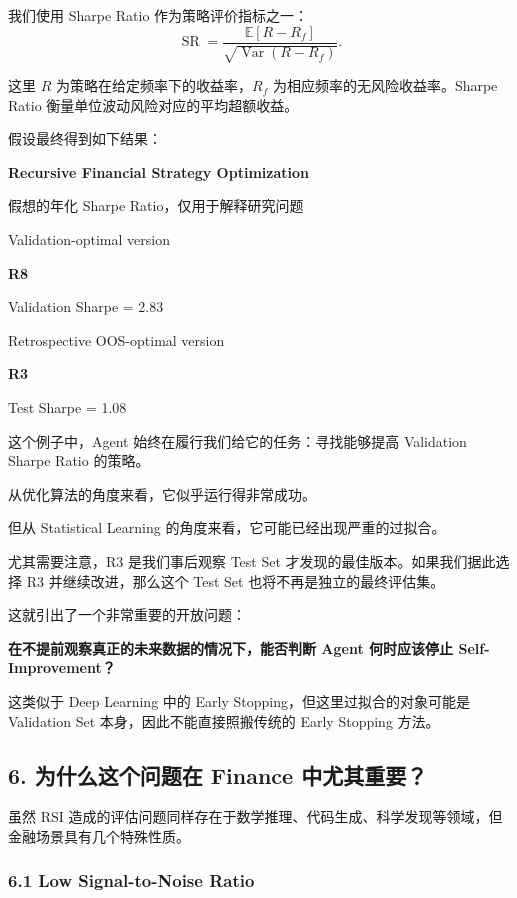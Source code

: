 我们使用 Sharpe Ratio 作为策略评价指标之一：
\[\operatorname{SR}
=
\frac{\mathbb E[R-R_f]}
{\sqrt{\operatorname{Var}(R-R_f)}}.\]

这里 \(R\) 为策略在给定频率下的收益率，\(R_f\) 为相应频率的无风险收益率。Sharpe Ratio 衡量单位波动风险对应的平均超额收益。

假设最终得到如下结果：

\textbf{Recursive Financial Strategy Optimization}

假想的年化 Sharpe Ratio，仅用于解释研究问题


Validation-optimal version

\textbf{R8}

Validation Sharpe = 2.83

Retrospective OOS-optimal version

\textbf{R3}

Test Sharpe = 1.08

这个例子中，Agent 始终在履行我们给它的任务：寻找能够提高 Validation Sharpe Ratio 的策略。

从优化算法的角度来看，它似乎运行得非常成功。

但从 Statistical Learning 的角度来看，它可能已经出现严重的过拟合。

尤其需要注意，R3 是我们事后观察 Test Set 才发现的最佳版本。如果我们据此选择 R3 并继续改进，那么这个 Test Set 也将不再是独立的最终评估集。

这就引出了一个非常重要的开放问题：

\textbf{在不提前观察真正的未来数据的情况下，能否判断 Agent 何时应该停止 Self-Improvement？}

这类似于 Deep Learning 中的 Early Stopping，但这里过拟合的对象可能是 Validation Set 本身，因此不能直接照搬传统的 Early Stopping 方法。

\hypertarget{part-1-03-0001-ux4e3aux4ec0ux4e48ux8fd9ux4e2aux95eeux9898ux5728-finance-ux4e2dux5c24ux5176ux91cdux8981}{%
\subsection{6. 为什么这个问题在 Finance 中尤其重要？}\label{part-1-03-0001-ux4e3aux4ec0ux4e48ux8fd9ux4e2aux95eeux9898ux5728-finance-ux4e2dux5c24ux5176ux91cdux8981}}

虽然 RSI 造成的评估问题同样存在于数学推理、代码生成、科学发现等领域，但金融场景具有几个特殊性质。

\hypertarget{part-1-03-0001-low-signal-to-noise-ratio}{%
\subsubsection{6.1 Low Signal-to-Noise Ratio}\label{part-1-03-0001-low-signal-to-noise-ratio}}

